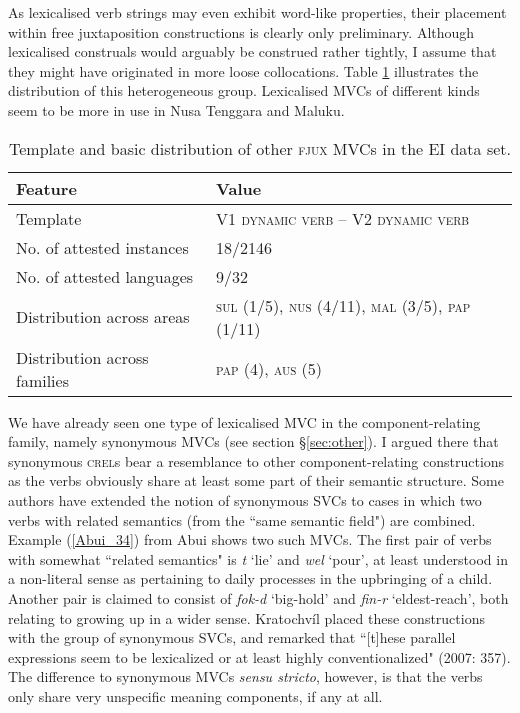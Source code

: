 As lexicalised verb strings may even exhibit word-like properties, their placement within free juxtaposition constructions is clearly only preliminary. Although lexicalised construals would arguably be construed rather tightly, I assume that they might have originated in more loose collocations. Table \ref{table:other_fjux} illustrates the distribution of this heterogeneous group. Lexicalised MVCs of different kinds seem to be more in use in Nusa Tenggara and Maluku. 

\begin{table}


\begin{tabular}{ll}
\lsptoprule
Feature&Value\tabularnewline
\hline
Template& V1 \textsc{dynamic verb} -- V2 \textsc{dynamic verb}\tabularnewline
No. of attested instances& 18/2146 \tabularnewline
No. of attested languages& 9/32 \tabularnewline
Distribution across areas& \textsc{sul} (1/5), \textsc{nus} (4/11), \textsc{mal} (3/5), \textsc{pap} (1/11) \tabularnewline
Distribution across families& \textsc{pap} (4), \textsc{aus} (5) \tabularnewline
\hline
\end{tabular}
\caption[Template and basic distribution of other \textsc{fjux} MVCs]{Template and basic distribution of other \textsc{fjux} MVCs in the EI data set.}
\label{table:other_fjux}
\end{table}


We have already seen one type of lexicalised MVC in the component-relating family, namely synonymous MVCs (see section §\ref{sec:other}). I argued there that synonymous \textsc{crel}s bear a resemblance to other component-relating constructions as the verbs obviously share at least some part of their semantic structure. Some authors have extended the notion of synonymous SVCs to cases in which two verbs with related semantics (from the ``same semantic field") are combined. Example (\ref{Abui_34}) from Abui shows two such MVCs. The first pair of verbs with somewhat ``related semantics" is \textit{t} `lie' and \textit{wel} `pour', at least understood in a non-literal sense as pertaining to daily processes in the upbringing of a child. Another pair is claimed to consist of \textit{fok-d} `big-hold' and \textit{fin-r} `eldest-reach', both relating to growing up in a wider sense. Kratochvíl placed these constructions with the group of synonymous SVCs, and remarked that ``[t]hese parallel expressions seem to be lexicalized or at least highly conventionalized" (2007: 357). The difference to synonymous MVCs \textit{sensu stricto}, however, is that the verbs only share very unspecific meaning components, if any at all.

